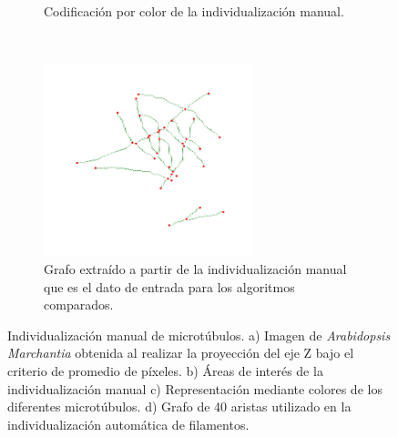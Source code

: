 \begin{figure}[h!]
\begin{subfigure}[t]{0.49\textwidth}
        \caption{Codificaci\'on por color de la individualizaci\'on manual.}
        \label{fig:field3t0filtered1-indivManual}
    \end{subfigure}
    ~
    \begin{subfigure}[t]{0.49\textwidth}
        \centering
        \includegraphics[height=2.2in]{benchImages/field3-t0-2cellBcrop-filtered-graph-thick.png}
        \caption{Grafo extra\'ido a partir de la individualizaci\'on manual que es el dato de entrada para los algoritmos comparados.}
        \label{fig:field3t0filtered1-graph}
    \end{subfigure}
    \caption{Individualizaci\'on manual de microt\'ubulos. a) Imagen de {\it Arabidopsis Marchantia} obtenida al realizar la proyecci\'on del eje Z bajo el criterio de promedio de p\'ixeles. b) \'Areas de inter\'es de la individualizaci\'on manual c) Representaci\'on mediante colores de los diferentes microt\'ubulos. d) Grafo de 40 aristas utilizado en la individualizaci\'on autom\'atica de filamentos.}
    \label{fig:field3t0filtered1}
\end{figure}



